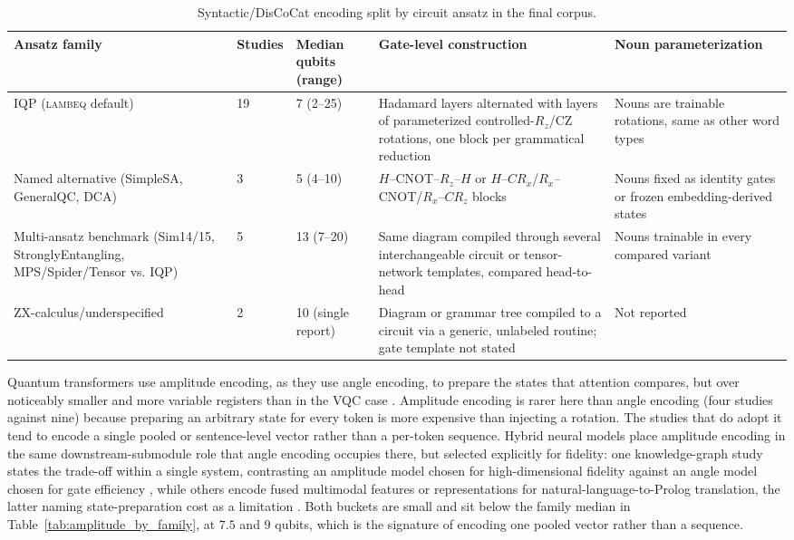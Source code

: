 \documentclass{ieeeaccess}
\begin{document}
\begin{table}[t!]
\caption{Syntactic/DisCoCat encoding split by circuit ansatz in the final corpus.}
\label{tab:syntactic_by_ansatz}
\centering
\scriptsize
\begin{tabular}{@{}p{} p{} p{} p{} p{}@{}}
\hline
\textbf{Ansatz family} & \textbf{Studies} & \textbf{Median qubits (range)} & \textbf{Gate-level construction} & \textbf{Noun parameterization} \\
\hline
IQP (\textsc{lambeq} default) & 19 & 7 (2--25) & Hadamard layers alternated with layers of parameterized controlled-$R_z$/CZ rotations, one block per grammatical reduction & Nouns are trainable rotations, same as other word types \\
Named alternative (SimpleSA, GeneralQC, DCA) & 3 & 5 (4--10) & $H$--CNOT--$R_z$--$H$ or $H$--$CR_x$/$R_x$--CNOT/$R_x$--$CR_z$ blocks & Nouns fixed as identity gates or frozen embedding-derived states \\
Multi-ansatz benchmark (Sim14/15, StronglyEntangling, MPS/Spider/Tensor vs. IQP) & 5 & 13 (7--20) & Same diagram compiled through several interchangeable circuit or tensor-network templates, compared head-to-head & Nouns trainable in every compared variant \\
ZX-calculus/underspecified & 2 & 10 (single report) & Diagram or grammar tree compiled to a circuit via a generic, unlabeled routine; gate template not stated & Not reported \\
\hline
\end{tabular}
\end{table}

Quantum transformers use amplitude encoding, as they use angle encoding, to prepare the states that attention compares, but over noticeably smaller and more variable registers than in the VQC case \cite{zheng_design_2023,sharma_elevating_2025,aktar_hybrid_2026,karanath_q-optbert_2026,karanath_q-entangleformer_2026}. Amplitude encoding is rarer here than angle encoding (four studies against nine) because preparing an arbitrary state for every token is more expensive than injecting a rotation. The studies that do adopt it tend to encode a single pooled or sentence-level vector rather than a per-token sequence. Hybrid neural models place amplitude encoding in the same downstream-submodule role that angle encoding occupies there, but selected explicitly for fidelity: one knowledge-graph study states the trade-off within a single system, contrasting an amplitude model chosen for high-dimensional fidelity against an angle model chosen for gate efficiency \cite{hendl_incorporating_2025}, while others encode fused multimodal features or representations for natural-language-to-Prolog translation, the latter naming state-preparation cost as a limitation \cite{zheng_quantum_2025,ahmed_quantum_2024}. Both buckets are small and sit below the family median in Table~\ref{tab:amplitude_by_family}, at $7.5$ and $9$ qubits, which is the signature of encoding one pooled vector rather than a sequence.
\end{document}
